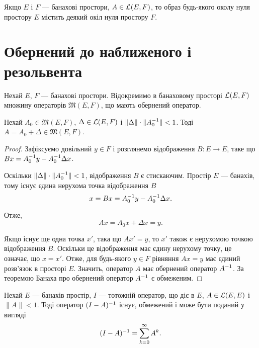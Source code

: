 \begin{corollary}
Якщо $E$ і $F$ --- банахові простори,
$A \in \mathcal{L}(E, F)$, то образ будь-якого околу нуля простору $E$
містить деякий окіл нуля простору $F$.
\end{corollary}

\section{Обернений до наближеного і резольвента}

Нехай $E$, $F$ --- банахові простори. Відокремимо в
банаховому просторі $\mathcal{L}(E, F)$ множину операторів
$\mathfrak{M}(E, F)$, що мають обернений оператор.

\begin{theorem}
Нехай $A_0 \in \mathfrak{M}(E, F)$, $\Delta \in \mathcal{L}(E, F)$ і
$\|\Delta\| \cdot \|A_0^{-1}\| < 1$.
Тоді $A = A_0 + \Delta \in \mathfrak{M}(E, F)$.
\end{theorem}

\begin{proof}
Зафіксуємо довільний $y \in F$ і розглянемо
відображення $B: E \to E$, таке що $B x = A_0^{-1} y - A_0^{-1} \Delta x$.

Оскільки $\|\Delta\| \cdot \|A_0^{-1}\| < 1$, відображення $B$ є стискаючим.
Простір $E$ --- банахів, тому існує єдина нерухома точка відображення $B$
\begin{equation*}
    x = B x = A_0^{-1} y - A_0^{-1} \Delta x.
\end{equation*}

Отже,
\begin{equation*}
    A x = A_0 x + \Delta x = y.
\end{equation*}

Якщо існує ще одна точка $x'$, така що $A x' = y$,
то $x'$ також є нерухомою точкою відображення $B$.
Оскільки це відображення має єдину нерухому точку,
це означає, що $x = x'$.
Отже, для будь-якого $y \in F$ рівняння $A x = y$
має єдиний розв’язок в просторі $E$.
Значить, оператор $A$ має обернений оператор $A^{-1}$.
За теоремою Банаха про обернений оператор $A^{-1}$ є обмеженим. 
\end{proof}

\begin{theorem}
Нехай $E$ --- банахів простір,
$I$ --- тотожній оператор, що діє в $E$,
$A \in \mathcal{L}(E, E)$ і $\|A\| < 1$.
Тоді оператор $(I - A)^{-1}$ існує, обмежений
і може бути поданий у вигляді
\begin{equation*}
    (I - A)^{-1} = \sum_{k = 0}^\infty A^k.
\end{equation*}
\end{theorem}

